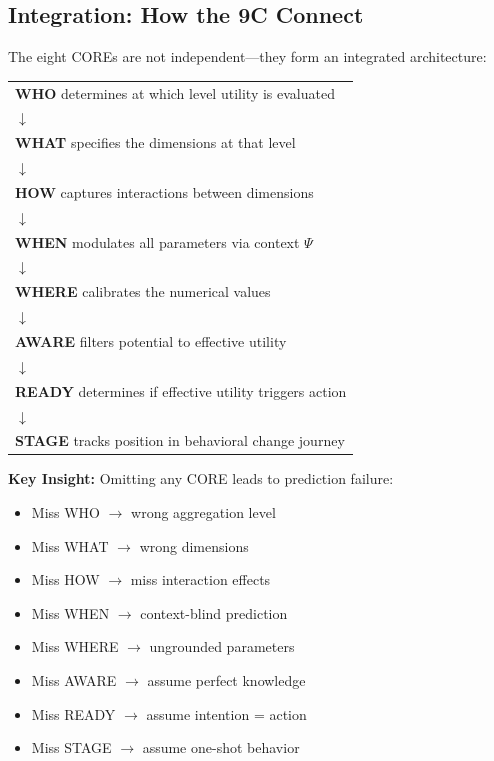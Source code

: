 \subsection{Integration: How the 9C Connect}
\label{sec:8c-integration}

The eight COREs are not independent---they form an integrated architecture:

\begin{tcolorbox}[colback=green!5!white, colframe=green!75!black,
    title=\textbf{The 9C Integration Structure}]

\begin{center}
\begin{tabular}{@{}l@{}}
\textbf{WHO} determines at which level utility is evaluated \\
$\downarrow$ \\
\textbf{WHAT} specifies the dimensions at that level \\
$\downarrow$ \\
\textbf{HOW} captures interactions between dimensions \\
$\downarrow$ \\
\textbf{WHEN} modulates all parameters via context $\Psi$ \\
$\downarrow$ \\
\textbf{WHERE} calibrates the numerical values \\
$\downarrow$ \\
\textbf{AWARE} filters potential to effective utility \\
$\downarrow$ \\
\textbf{READY} determines if effective utility triggers action \\
$\downarrow$ \\
\textbf{STAGE} tracks position in behavioral change journey \\
\end{tabular}
\end{center}

\textbf{Key Insight:} Omitting any CORE leads to prediction failure:
\begin{itemize}[nosep]
\item Miss WHO $\rightarrow$ wrong aggregation level
\item Miss WHAT $\rightarrow$ wrong dimensions
\item Miss HOW $\rightarrow$ miss interaction effects
\item Miss WHEN $\rightarrow$ context-blind prediction
\item Miss WHERE $\rightarrow$ ungrounded parameters
\item Miss AWARE $\rightarrow$ assume perfect knowledge
\item Miss READY $\rightarrow$ assume intention = action
\item Miss STAGE $\rightarrow$ assume one-shot behavior
\end{itemize}

\end{tcolorbox}

